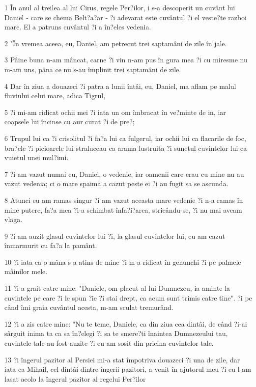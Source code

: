 \par 1 În anul al treilea al lui Cirus, regele Per?ilor, i s-a descoperit un cuvânt lui Daniel - care se chema Belt?a?ar - ?i adevarat este cuvântul ?i el veste?te razboi mare. El a patruns cuvântul ?i a în?eles vedenia.
\par 2 "În vremea aceea, eu, Daniel, am petrecut trei saptamâni de zile în jale.
\par 3 Pâine buna n-am mâncat, carne ?i vin n-am pus în gura mea ?i cu miresme nu m-am uns, pâna ce nu s-au împlinit trei saptamâni de zile.
\par 4 Dar în ziua a douazeci ?i patra a lunii întâi, eu, Daniel, ma aflam pe malul fluviului celui mare, adica Tigrul,
\par 5 ?i mi-am ridicat ochii mei ?i iata un om îmbracat în ve?minte de in, iar coapsele lui încinse cu aur curat ?i de pre?;
\par 6 Trupul lui ca ?i crisolitul ?i fa?a lui ca fulgerul, iar ochii lui ca flacarile de foc, bra?ele ?i picioarele lui straluceau ca arama lustruita ?i sunetul cuvintelor lui ca vuietul unei mul?imi.
\par 7 ?i am vazut numai eu, Daniel, o vedenie, iar oamenii care erau cu mine nu au vazut vedenia; ci o mare spaima a cazut peste ei ?i au fugit sa se ascunda.
\par 8 Atunci eu am ramas singur ?i am vazut aceasta mare vedenie ?i n-a ramas în mine putere, fa?a mea ?i-a schimbat înfa?i?area, stricându-se, ?i nu mai aveam vlaga.
\par 9 ?i am auzit glasul cuvintelor lui ?i, la glasul cuvintelor lui, eu am cazut înmarmurit cu fa?a la pamânt.
\par 10 ?i iata ca o mâna s-a atins de mine ?i m-a ridicat în genunchi ?i pe palmele mâinilor mele.
\par 11 ?i a grait catre mine: "Daniele, om placut al lui Dumnezeu, ia aminte la cuvintele pe care ?i le spun ?ie ?i stai drept, ca acum sunt trimis catre tine". ?i pe când îmi graia cuvântul acesta, m-am sculat tremurând.
\par 12 ?i a zis catre mine: "Nu te teme, Daniele, ca din ziua cea dintâi, de când ?i-ai sârguit inima ta ca sa în?elegi ?i sa te smere?ti înaintea Dumnezeului tau, cuvintele tale au fost auzite ?i eu am sosit din pricina cuvintelor tale.
\par 13 ?i îngerul pazitor al Persiei mi-a stat împotriva douazeci ?i una de zile, dar iata ca Mihail, cel dintâi dintre îngerii pazitori, a venit în ajutorul meu ?i eu l-am lasat acolo la îngerul pazitor al regelui Per?ilor
